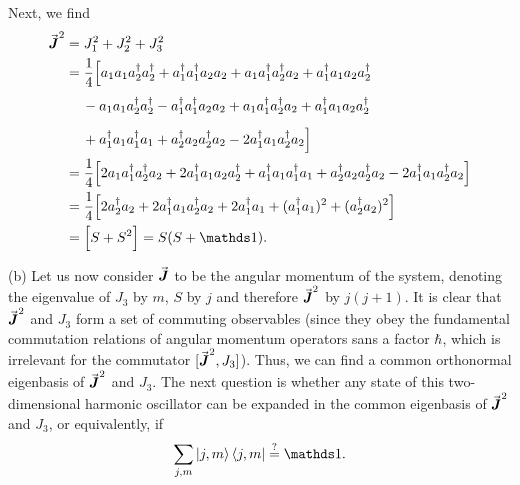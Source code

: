 {Next, we find
\begin{eqnarray}
\begin{aligned}
    \va*{J}^2 &= J_1^2 + J_2^2 + J_3^2 \\
              &= \frac{1}{4} \Big[ a_1 a_1 a_2^{\dagger} a_2^{\dagger} + a_1^{\dagger} a_1^{\dagger} a_2 a_2 + a_1 a_1^{\dagger} a_2^{\dagger} a_2 + a_1^{\dagger} a_1 a_2 a_2^{\dagger} \\
              &\phantom{\frac{1}{4}\Big[} - a_1 a_1 a_2^{\dagger} a_2^{\dagger} - a_1^{\dagger} a_1^{\dagger} a_2 a_2 + a_1 a_1^{\dagger} a_2^{\dagger} a_2 + a_1^{\dagger} a_1 a_2 a_2^{\dagger} \\
              &\phantom{\frac{1}{4} \Big[} + a_1^{\dagger} a_1 a_1^{\dagger} a_1 + a_2^{\dagger} a_2 a_2^{\dagger} a_2 - 2 a_1^{\dagger} a_1 a_2^{\dagger} a_2 \Big] \\
              &= \frac{1}{4} \Big[ 2 a_1 a_1^{\dagger} a_2^{\dagger} a_2 + 2 a_1^{\dagger} a_1 a_2 a_2^{\dagger} + a_1^{\dagger} a_1 a_1^{\dagger} a_1 + a_2^{\dagger} a_2 a_2^{\dagger} a_2 - 2a_1^{\dagger} a_1 a_2^{\dagger} a_2 \Big] \\
              &= \frac{1}{4} \Big[ 2a_2^{\dagger}a_2 + 2 a_1^{\dagger} a_1 a_2^{\dagger} a_2 + 2 a_1^{\dagger} a_1 + (a_1^{\dagger} a_1)^2 + (a_2^{\dagger} a_2)^2 \Big] \\
              &= \Big[ S + S^2 \Big] = S (S + \id)
.\end{aligned}
\end{eqnarray}

(b) Let us now consider $\va*{J}$ to be the angular momentum of the system, denoting the eigenvalue of $J_3$ by $m$, $S$ by $j$ and therefore $\va*{J}^2$ by $j(j+1)$.
It is clear that $\va*{J}^2$ and $J_3$ form a set of commuting observables (since they obey the fundamental commutation relations of angular momentum operators sans a factor $\hbar$, which is irrelevant for the commutator $[\va*{J}^2,J_3]$).
Thus, we can find a common orthonormal eigenbasis of $\va*{J}^2$ and $J_3$.
The next question is whether any state of this two-dimensional harmonic oscillator can be expanded in the common eigenbasis of $\va*{J}^2$ and $J_3$, or equivalently, if
\begin{eqnarray}
    \sum_{j,m} \ket{j,m} \bra{j,m} \stackrel{?}{=} \id
.\end{eqnarray}

}
